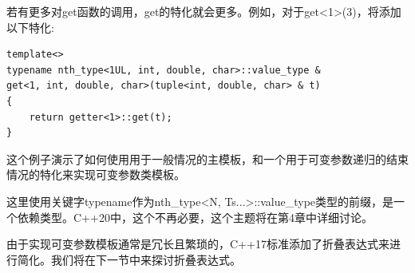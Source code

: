 若有更多对get函数的调用，get的特化就会更多。例如，对于get<1>(3)，将添加以下特化:

\begin{lstlisting}[style=styleCXX]
template<>
typename nth_type<1UL, int, double, char>::value_type &
get<1, int, double, char>(tuple<int, double, char> & t)
{
	return getter<1>::get(t);
}
\end{lstlisting}

这个例子演示了如何使用用于一般情况的主模板，和一个用于可变参数递归的结束情况的特化来实现可变参数类模板。

这里使用关键字typename作为nth\_type<N, Ts...>::value\_type类型的前缀，是一个依赖类型。C++20中，这个不再必要，这个主题将在第4章中详细讨论。

由于实现可变参数模板通常是冗长且繁琐的，C++17标准添加了折叠表达式来进行简化。我们将在下一节中来探讨折叠表达式。


